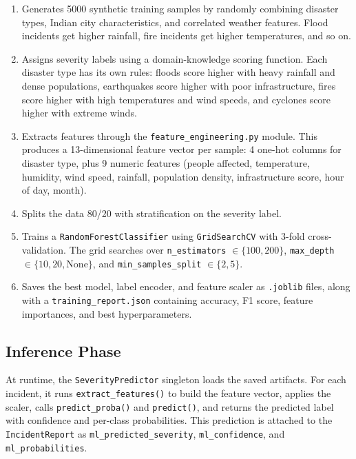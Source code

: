 \begin{enumerate}[leftmargin=*]
    \item Generates 5000 synthetic training samples by randomly combining disaster types, Indian city characteristics, and correlated weather features. Flood incidents get higher rainfall, fire incidents get higher temperatures, and so on.

    \item Assigns severity labels using a domain-knowledge scoring function. Each disaster type has its own rules: floods score higher with heavy rainfall and dense populations, earthquakes score higher with poor infrastructure, fires score higher with high temperatures and wind speeds, and cyclones score higher with extreme winds.

    \item Extracts features through the \texttt{feature\_engineering.py} module. This produces a 13-dimensional feature vector per sample: 4 one-hot columns for disaster type, plus 9 numeric features (people affected, temperature, humidity, wind speed, rainfall, population density, infrastructure score, hour of day, month).

    \item Splits the data 80/20 with stratification on the severity label.

    \item Trains a \texttt{RandomForestClassifier} using \texttt{GridSearchCV} with 3-fold cross-validation. The grid searches over \texttt{n\_estimators} $\in \{100, 200\}$, \texttt{max\_depth} $\in \{10, 20, \text{None}\}$, and \texttt{min\_samples\_split} $\in \{2, 5\}$.

    \item Saves the best model, label encoder, and feature scaler as \texttt{.joblib} files, along with a \texttt{training\_report.json} containing accuracy, F1 score, feature importances, and best hyperparameters.
\end{enumerate}

\subsection{Inference Phase}

At runtime, the \texttt{SeverityPredictor} singleton loads the saved artifacts. For each incident, it runs \texttt{extract\_features()} to build the feature vector, applies the scaler, calls \texttt{predict\_proba()} and \texttt{predict()}, and returns the predicted label with confidence and per-class probabilities. This prediction is attached to the \texttt{IncidentReport} as \texttt{ml\_predicted\_severity}, \texttt{ml\_confidence}, and \texttt{ml\_probabilities}.

